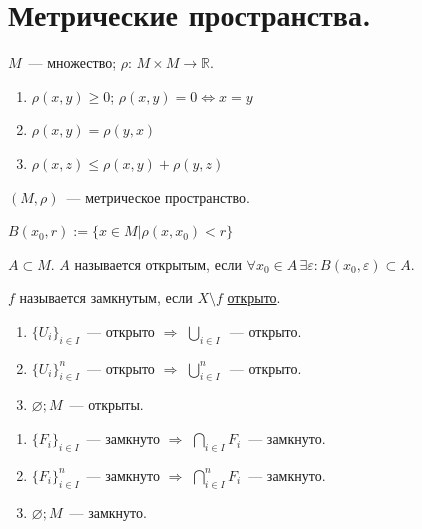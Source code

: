 \documentclass[12pt]{article}
\begin{document}
	\section{Метрические пространства.}
	
	\begin{definition}
		$M$~--- множество; $\rho$: $M \times M \rightarrow \mathbb{R}$.
		\begin{enumerate}
			\item $\rho(x, y) \geqslant 0$; $\rho(x, y) = 0 \Leftrightarrow x = y$
			\item $\rho(x, y) = \rho(y, x)$
			\item $\rho(x, z) \leqslant \rho(x, y) + \rho(y, z)$
		\end{enumerate}
		$(M, \rho)$~--- метрическое пространство.
	\end{definition}
	
	\begin{definition}
		$B(x_0, r) := \{ x \in M | \rho(x, x_0) < r \}$
	\end{definition}
	
	\begin{definition}
		\label{open-def}
		$A \subset M$. $A$ называется открытым, если $\forall x_0 \in A \, \exists \varepsilon: B(x_0, \varepsilon) \subset A$.
	\end{definition}
	
	\begin{definition}
		$f$ называется замкнутым, если $X \setminus f$ \hyperref[open-def]{открыто}.
	\end{definition}
	
	\begin{theorem}
		\begin{enumerate}
			\item $\{ U_i \}_{i \in I}$~--- открыто $\Rightarrow$ $\bigcup\limits_{i \in I}$~--- открыто.
			\item $\{ U_i \}_{i \in I}^{n}$~--- открыто $\Rightarrow$ $\bigcup\limits_{i \in I}^{n}$~--- открыто.
			\item $\varnothing; M$~--- открыты.
		\end{enumerate}
	\end{theorem}
	
	\begin{theorem}
		\begin{enumerate}
			\item $\{ F_i \}_{i \in I}$~--- замкнуто $\Rightarrow$ $\bigcap\limits_{i \in I} F_i$~--- замкнуто.
			\item $\{ F_i \}_{i \in I}^{n}$~--- замкнуто $\Rightarrow$ $\bigcap\limits_{i \in I}^{n} F_i$~--- замкнуто.
			\item $\varnothing; M$~--- замкнуто.
		\end{enumerate}
	\end{theorem}
	
\end{document}
